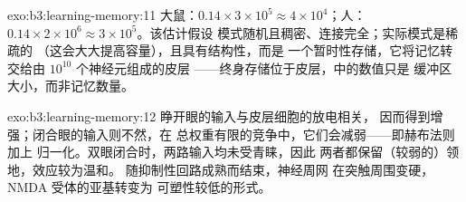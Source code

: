 \begin{solution}{exo:b3:learning-memory:11}
大鼠：$0.14\times 3\times 10^{5} \approx 4\times 10^{4}$；人：$0.14
\times 2\times 10^{6} \approx 3\times 10^{5}$。该估计假设
模式随机且稠密、连接完全；实际模式是稀疏的
（这会大大提高容量），且具有结构性，而是
一个暂时性存储，它将记忆转交给由 $10^{10}$ 个神经元组成的皮层
——终身存储位于皮层，中的数值只是
缓冲区大小，而非记忆数量。
\end{solution}

\begin{solution}{exo:b3:learning-memory:12}
睁开眼的输入与皮层细胞的放电相关，
因而得到增强；闭合眼的输入则不然，在
总权重有限的竞争中，它们会减弱——即赫布法则加上
归一化。双眼闭合时，两路输入均未受青睐，因此
两者都保留（较弱的）领地，效应较为温和。
随抑制性回路成熟而结束，神经周网
在突触周围变硬，NMDA 受体的亚基转变为
可塑性较低的形式。
\end{solution}

